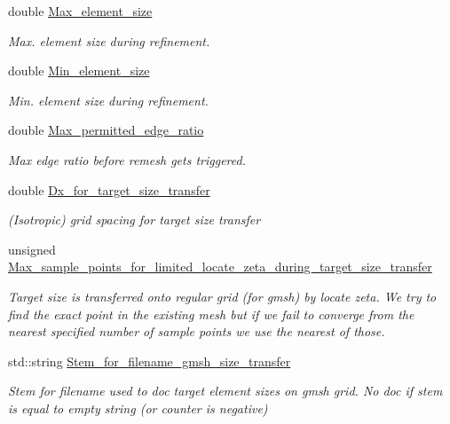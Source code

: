 \begin{DoxyCompactItemize}
double \hyperlink{classoomph_1_1GmshParameters_a65bd88591891ff4284fb4e03d6f49c14}{Max\+\_\+element\+\_\+size}
\begin{DoxyCompactList}\small\item\em Max. element size during refinement. \end{DoxyCompactList}\item 
double \hyperlink{classoomph_1_1GmshParameters_a8efec35bdf92a73cf71f25cff41520b7}{Min\+\_\+element\+\_\+size}
\begin{DoxyCompactList}\small\item\em Min. element size during refinement. \end{DoxyCompactList}\item 
double \hyperlink{classoomph_1_1GmshParameters_ac62bbb70b5a1bd650f7b0b7c8fbe1d8f}{Max\+\_\+permitted\+\_\+edge\+\_\+ratio}
\begin{DoxyCompactList}\small\item\em Max edge ratio before remesh gets triggered. \end{DoxyCompactList}\item 
double \hyperlink{classoomph_1_1GmshParameters_a0c4d7e327d44f9514eb0ac0894f6f9d9}{Dx\+\_\+for\+\_\+target\+\_\+size\+\_\+transfer}
\begin{DoxyCompactList}\small\item\em (Isotropic) grid spacing for target size transfer \end{DoxyCompactList}\item 
unsigned \hyperlink{classoomph_1_1GmshParameters_a7a75351daca7e20f9dcb95919691d863}{Max\+\_\+sample\+\_\+points\+\_\+for\+\_\+limited\+\_\+locate\+\_\+zeta\+\_\+during\+\_\+target\+\_\+size\+\_\+transfer}
\begin{DoxyCompactList}\small\item\em Target size is transferred onto regular grid (for gmsh) by locate zeta. We try to find the exact point in the existing mesh but if we fail to converge from the nearest specified number of sample points we use the nearest of those. \end{DoxyCompactList}\item 
std\+::string \hyperlink{classoomph_1_1GmshParameters_ad0151a908bc36fee2d955551b1da4016}{Stem\+\_\+for\+\_\+filename\+\_\+gmsh\+\_\+size\+\_\+transfer}
\begin{DoxyCompactList}\small\item\em Stem for filename used to doc target element sizes on gmsh grid. No doc if stem is equal to empty string (or counter is negative) \end{DoxyCompactList}\item 

\end{DoxyCompactItemize}
